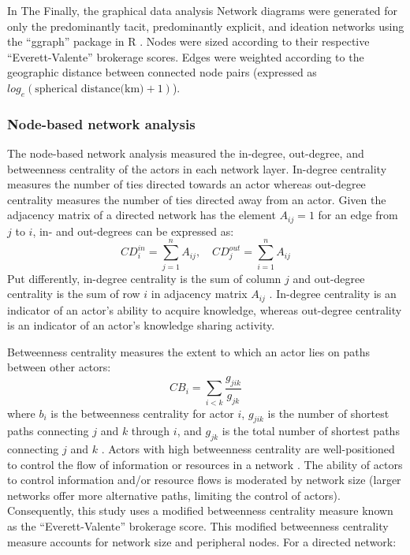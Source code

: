 In The Finally, the graphical data analysis Network diagrams were generated for only the predominantly tacit, predominantly explicit, and ideation networks using the \enquote{ggraph} package in R \citep{pedersen2018ggraph}. Nodes were sized according to their respective \enquote{Everett-Valente} brokerage scores. Edges were weighted according to the geographic distance between connected node pairs (expressed as $log_e(\text{spherical distance(km)} + 1)$). \medskip\medskip

\subsubsection{Node-based network analysis}

The node-based network analysis measured the in-degree, out-degree, and betweenness centrality of the actors in each network layer. In-degree centrality measures the number of ties directed towards an actor whereas out-degree centrality measures the number of ties directed away from an actor. Given the adjacency matrix of a directed network has the element $A_{ij} = 1$ for an edge from $j$ to $i$, in- and out-degrees can be expressed as: $$CD_i^{in} = \sum_{j = 1}^nA_{ij}, \,\,\,\,\,\, CD_j^{out} = \sum_{i = 1}^nA_{ij}$$ \noindent Put differently, in-degree centrality is the sum of column $j$ and out-degree centrality is the sum of row $i$ in adjacency matrix $A_{ij}$ \citep{newman2010networks}. In-degree centrality is an indicator of an actor's ability to acquire knowledge, whereas out-degree centrality is an indicator of an actor's knowledge sharing activity. \medskip

Betweenness centrality measures the extent to which an actor lies on paths between other actors: $$ CB_i=\sum_{i < k}\frac{g_{jik}}{g_{jk}} $$ where $b_i$ is the betweenness centrality for actor $i$, $g_{jik}$ is the number of shortest paths connecting $j$ and $k$ through $i$, and $g_{jk}$ is the total number of shortest paths connecting $j$ and $k$ \citep{freeman1979centrality}. Actors with high betweenness centrality are well-positioned to control the flow of information or resources in a network \citep{everett2016bridging}. The ability of actors to control information and/or resource flows is moderated by network size (larger networks offer more alternative paths, limiting the control of actors). Consequently, this study uses a modified betweenness centrality measure known as the \enquote{Everett-Valente} brokerage score. This modified betweenness centrality measure accounts for network size and peripheral nodes. For a directed network: $$ $$ \medskip



